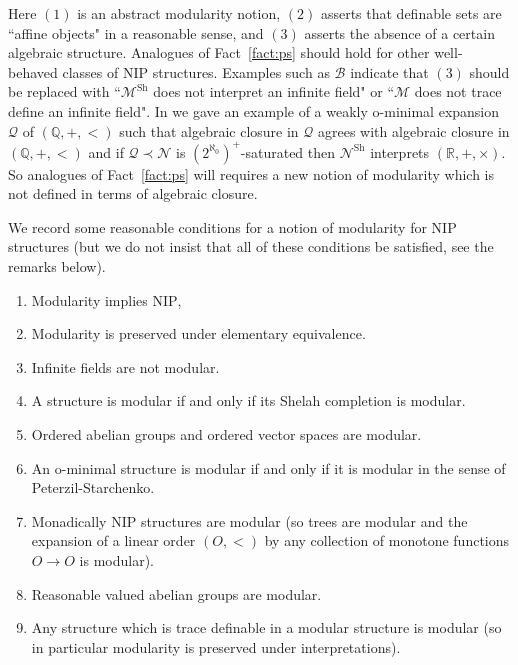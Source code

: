 \documentclass[bibalpha]{amsart}
\theoremstyle{definition}
\theoremstyle{remark}
\newcommand{\Sh}[1]{\ensuremath{\mathscr{#1}^{\mathrm{Sh}}}}
\newcommand{\nip}{\mathrm{NIP}}
\newcommand{\Sa}[1]{\ensuremath{\mathscr{#1}}}
\newcommand{\Q}{\mathbb{Q}}
\newcommand{\R}{\mathbb{R}}
\begin{document}
\noindent
Here $(1)$ is an abstract modularity notion, $(2)$ asserts that definable sets are ``affine objects" in a reasonable sense, and $(3)$ asserts the absence of a certain algebraic structure.
Analogues of Fact~\ref{fact:ps} should hold for other well-behaved classes of $\nip$ structures.
Examples such as $\Sa B$ indicate that $(3)$ should be replaced with ``$\Sh M$ does not interpret an infinite field" or ``$\Sa M$ does not trace define an infinite field".
In \cite{big-nip} we gave an example of a weakly o-minimal expansion $\Sa Q$ of $(\Q,+,<)$ such that algebraic closure in $\Sa Q$ agrees with algebraic closure in $(\Q,+,<)$ and if $\Sa Q \prec \Sa N$ is $(2^{\aleph_0})^+$-saturated then $\Sh N$ interprets $(\R,+,\times)$.
So analogues of Fact~\ref{fact:ps} will requires a new notion of modularity which is not defined in terms of algebraic closure.
\newline

\noindent
We record some reasonable conditions for a notion of modularity for $\nip$ structures (but we do not insist that all of these conditions be satisfied, see the remarks below).
\begin{enumerate}[label=(A\arabic*)]
    \item Modularity implies $\nip$,
    \item Modularity is preserved under elementary equivalence.
    \item Infinite fields are not modular.
    \item A structure is modular if and only if its Shelah completion is modular.
    \item Ordered abelian groups and ordered vector spaces are modular.
    \item An o-minimal structure is modular if and only if it is modular in the sense of Peterzil-Starchenko.
    \item Monadically $\nip$ structures are modular (so trees are modular and the expansion of a linear order $(O,<)$ by any collection of monotone functions $O \to O$ is modular).
    \item Reasonable valued abelian groups are modular.
    \item Any structure which is trace definable in a modular structure is modular (so in particular modularity is preserved under interpretations).
\end{enumerate}
\end{document}
